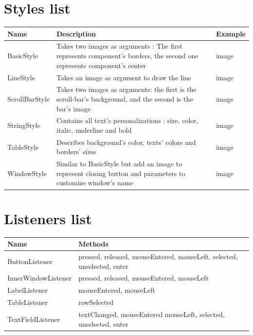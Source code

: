 \documentclass{scrreprt}
\begin{document}
					\chapter{Styles list}
\begin{tabular}{|p{3cm}|p{10cm}|p{2cm}|}
\hline
Name & Description & Example\\
\hline
BasicStyle & Takes two images as arguments : The first represents component's borders, the second one represents component's center & image \\
\hline
LineStyle & Takes an image as argument to draw the line & image \\
\hline
ScrollBarStyle & Takes two images as arguments: the first is the scroll-bar's background, and the second is the bar's image & image \\
\hline
StringStyle & Contains all text's personalizations : size, color, italic, underline and bold & image \\
\hline
TableStyle & Describes background's color, texts' colors and borders' sizes & image \\
\hline
WindowStyle & Similar to BasicStyle but add an image to represent closing button and parameters to customize window's name & image \\
\hline
\end{tabular}

					\chapter{Listeners list}
\begin{tabular}{|p{4cm}|p{10cm}|}
\hline
Name & Methods\\
\hline
ButtonListener & pressed, released, mouseEntered, mouseLeft, selected, unselected, enter \\
\hline
InnerWindowListener & pressed, released, mouseEntered, mouseLeft \\
\hline
LabelListener & mouseEntered, mouseLeft \\
\hline
TableListener & rowSelected \\
\hline
TextFieldListener & textChanged, mouseEntered mouseLeft, selected, unselected, enter \\
\hline
\end{tabular}

					
\end{document}
